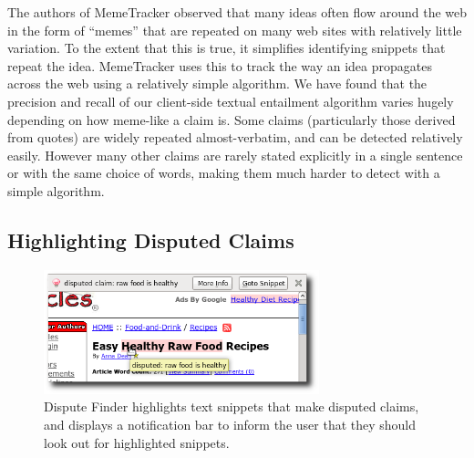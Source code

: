 \documentclass{www2010-submission}
\newcommand{\todo}[1]{}
\begin{document}
The authors of MemeTracker observed that many ideas often flow around the web in the form of ``memes'' that are repeated on many web sites with relatively little variation. To the extent that this is true, it simplifies identifying snippets that repeat the idea. MemeTracker uses this to track the way an idea propagates across the web using a relatively simple algorithm. We have found that the precision and recall of our client-side textual entailment algorithm varies hugely depending on how meme-like a claim is. Some claims (particularly those derived from quotes) are widely repeated almost-verbatim, and can be detected relatively easily. However many other claims are rarely stated explicitly in a single sentence or with the same choice of words, making them much harder to detect with a simple algorithm.

\todo{Give an example of a good meme}

\todo{Talk about what dispute finder does, and how it differs - maybe by moving this into the main system section}
\todo{Cite plagarism detection}
\todo{Talk about how our algorithm looks for key terms used in disputed claims}
\todo{Talk about how our first pass NLP algo is rather like }


\subsection{Highlighting Disputed Claims}

\begin{figure}[tb]
	\begin{center}
	\includegraphics[width=8cm]{pictures/highlight_bar.png}
	\caption{Dispute Finder highlights text snippets that make disputed claims, and displays a notification bar to inform the user that they should look out for highlighted snippets.}
	\label{highlight_bar}
	\end{center}
\end{figure}

%
%
\end{document}

